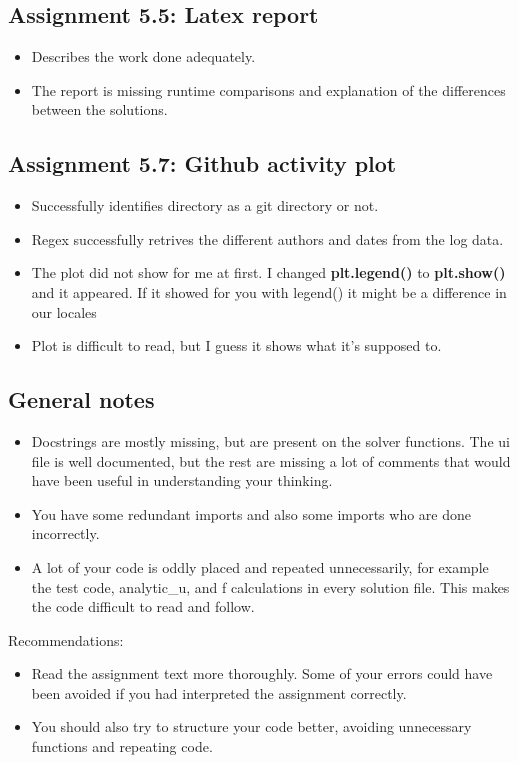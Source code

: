 \documentclass[a4paper]{article}
\begin{document}
\subsection*{Assignment 5.5: Latex report}
\begin{itemize}
\item Describes the work done adequately.
\item The report is missing runtime comparisons and explanation of the differences between the solutions.
\end{itemize}

\subsection*{Assignment 5.7: Github activity plot}
\begin{itemize}
\item Successfully identifies directory as a git directory or not.
\item Regex successfully retrives the different authors and dates from the log data.
\item The plot did not show for me at first. I changed \textbf{plt.legend()} to \textbf{plt.show()} and it appeared. If it showed for you with legend() it might be a difference in our locales
\item Plot is difficult to read, but I guess it shows what it's supposed to.
\end{itemize}
\subsection{General notes}\label{sec:notes}
\begin{itemize}
\item Docstrings are mostly missing, but are present on the solver functions. The ui file is well documented, but the rest are missing a lot of comments that would have been useful in understanding your thinking.
\item You have some redundant imports and also some imports who are done incorrectly.
\item A lot of your code is oddly placed and repeated unnecessarily, for example the test code, analytic\_u, and f calculations in every solution file. This makes the code difficult to read and follow.
\end{itemize}
Recommendations:
\begin{itemize}
\item Read the assignment text more thoroughly. Some of your errors could have been avoided if you had interpreted the assignment correctly.
\item You should also try to structure your code better, avoiding unnecessary functions and repeating code.
\end{itemize}


\end{document}
